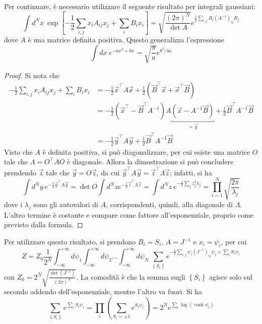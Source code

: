 \documentclass[11pt, a4paper]{scrartcl}
\theoremstyle{style}
\theoremstyle{style1}
\numberwithin{equation}{subsection}
\begin{document}
Per continuare, \`e necessario utilizzare il seguente risultato per integrali gaussiani:
\[
\int d^N x \ \exp \left[ -\frac{1}{2}\sum_{i,j}^{} x_i A_{ij} x_j + \sum_{i}^{} B_i x_i \right] = \sqrt{\frac{(2\pi)^N}{\det A}}  e^{\frac{1}{2}\sum_{i,j}^{} B_i (A^{-1})_{ij} B_j} 
\] 
dove $A$ \`e una matrice definita positiva.
Questo generalizza l'espressione 
\[
\int dx \ e^{-ax^2 + bx}= \sqrt{\frac{\pi}{a}} e^{b^2 / 4 a}
\] 
\begin{proof}
Si nota che
\[
\begin{split}
	-\frac{1}{2}\sum_{i,j}^{} x_iA_{ij} x_j + \sum_{i}^{} B_ix_i &=-\frac{1}{2} \vec{x}^\top A \vec{x} + \frac{1}{2} \left(\vec{B}^\top \vec{x} + \vec{x}^\top \vec{B}\right) \\
								     &= -\frac{1}{2} \left(\vec{x}^\top - \vec{B}^\top A^{-1}\right) A \underbracket{\left(\vec{x}-A^{-1}\vec{B}\right)}_{=  \vec{y}}   + \frac{1}{2} \vec{B}^\top A^{-1} \vec{B}\\
								     &= -\frac{1}{2}\vec{y}^\top A \vec{y} +\frac{1}{2}\vec{B}^\top A^{-1}\vec{B}
\end{split}
\] 
Visto che $A$ \`e definita positiva, si pu\`o diagonalizzare, per cui esiste una matrice $O$ tale che $\Lambda = O^\top AO$ \`e diagonale.
Allora la dimostrazione si pu\`o concludere prendendo $\vec{z}$ tale che $\vec{y}= O \vec{z}$, da cui $\vec{y}^\top A \vec{y} = \vec{z}^\top \Lambda \vec{z}$; infatti, si ha
\[
\int d^N y \ e^{-\frac{1}{2}\vec{y}^\top A \vec{y}} = \det O \int d^N z e^{-\frac{1}{2}\vec{z}^\top \Lambda \vec{z}} =\int d^N z \ e^{-\frac{1}{2}\sum_{j}^{} z_j^2 \lambda _j}= \prod_{i=1} ^N \sqrt{\frac{2\pi}{\lambda _j}} 
\] 
dove i $\lambda _j$ sono gli autovalori di $A$, corrispondenti, quindi, alla diagonale di $\Lambda $.
L'altro termine \`e costante e compare come fattore all'esponenziale, proprio come previsto dalla formula.
\end{proof}
Per utilizzare questo risultato, si prendono $B_i = S_i$, $A = J ^{-1}$ e $x_i = \psi _i$, per cui
\[
Z = Z_0 \frac{1}{2^N} \int_{-\infty} ^{+\infty}  d \psi _1 \int_{-\infty} ^{+\infty}  d \psi _2 \ldots \int_{-\infty} ^{+\infty}  d \psi _N \ \sum_{\left\{ S_i \right\} }^{} e^{-\frac{1}{2} \sum_{i,j}^{} \psi _i (J^{-1})_{ij} \psi _j + \sum_{i}^{} S_i \psi _i}
\] 
con $Z_0= 2^N \sqrt{\frac{\det (J^{-1})}{(2\pi)^N}} $.
La comodit\`a \`e che la somma sugli $\left\{ S_i \right\} $ agisce solo sul secondo addendo dell'esponenziale, mentre l'altro va fuori.
Si ha
\[
\sum_{\left\{ S_i \right\} }^{} e^{\sum_{i}^{} S_i \psi _i} = \prod_i \left(\sum_{S_i = \pm 1}^{} e^{S_i \psi _i}\right) = 2^N e^{\sum_{i}^{} \log(\cosh \psi _i)}
\] 
\end{document}
